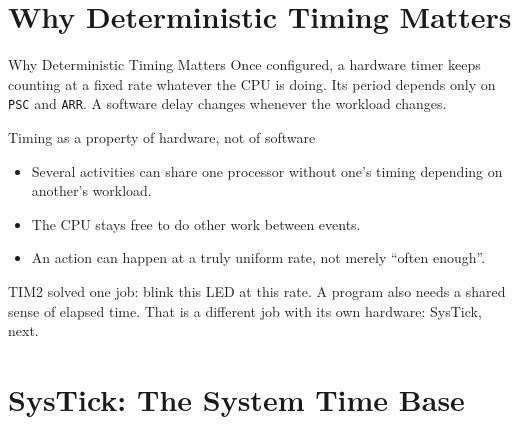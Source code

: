 \documentclass[9pt,aspectratio=169,xcolor=table]{beamer}
\begin{document}
\section{Why Deterministic Timing Matters}

\begin{frame}{Why Deterministic Timing Matters}
    \leavevmode
    Once configured, a hardware timer keeps counting at a fixed rate \alert{whatever the CPU is doing}. Its period depends only on \texttt{PSC} and \texttt{ARR}. A software delay changes whenever the workload changes.

    \vspace{3mm}
    \begin{block}{Timing as a property of hardware, not of software}
        {\small
        \begin{itemize}\itemsep2pt
            \item Several activities can share one processor without one's timing depending on another's workload.
            \item The CPU stays free to do other work between events.
            \item An action can happen at a truly \alert{uniform} rate, not merely ``often enough''.
        \end{itemize}}
    \end{block}

    \vspace{3mm}
    {\small TIM2 solved one job: blink this LED at this rate. A program also needs a shared sense of \alert{elapsed time}. That is a different job with its own hardware: SysTick, next.}
\end{frame}


\section{SysTick: The System Time Base}
\end{document}
